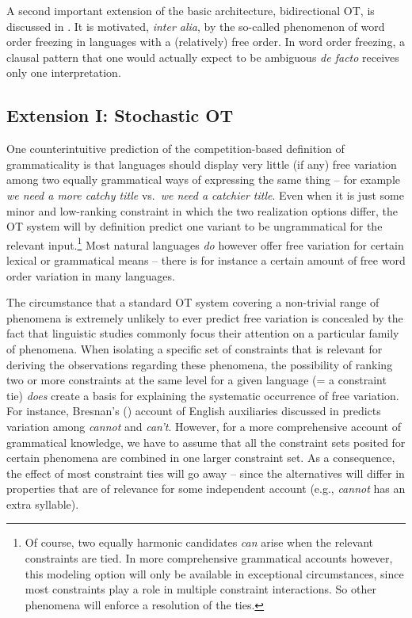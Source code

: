 \documentclass[output=paper,hidelinks]{langscibook}
\begin{document}
A second important extension of the basic architecture, bidirectional OT, is discussed in . It is motivated, \emph{inter alia}, by the so-called phenomenon of word order freezing in languages with a (relatively) free order. In word order freezing, a clausal pattern that one would actually expect to be ambiguous \emph{de facto} receives only one interpretation.

\subsection{Extension I: Stochastic OT}
\label{sec:OT:stoch-OT}

One counterintuitive prediction of the competition-based definition of grammaticality is that languages should display very little (if any) free variation among two equally grammatical ways of expressing the same thing -- for example \emph{we need a more catchy title} vs.\ \emph{we need a catchier title}. Even when it is just some minor and low-ranking constraint in which the two realization options differ, the OT system will by definition predict one variant to be ungrammatical for the relevant input.\footnote{Of course, two equally harmonic candidates \emph{can} arise when the relevant constraints are tied. In more comprehensive grammatical accounts however, this modeling option will only be available in exceptional circumstances, since most constraints play a role in multiple constraint interactions. So other phenomena will enforce a resolution of the ties.} Most natural languages \emph{do} however offer free variation for certain lexical or grammatical means -- there is for instance a certain amount of free word order variation in many languages. %

The  circumstance that a standard OT system covering a non-trivial range of phenomena is extremely unlikely to ever predict free variation is concealed by the fact that linguistic studies commonly focus their attention on a particular family of phenomena. When isolating a specific set of constraints that is relevant for deriving the observations regarding these phenomena, the possibility of ranking two or more constraints at the same level for a given language (= a constraint tie) \emph{does} create a basis for explaining the systematic occurrence of free variation. For instance, Bresnan's (\citeyear{Bresnan-Explaining-Morphosyntactic}) account of English auxiliaries discussed in  predicts variation among \emph{cannot} and \emph{can't}. However, for a more comprehensive account of grammatical knowledge, we have to assume that all the constraint sets posited for certain phenomena are combined in one larger constraint set. As a consequence, the effect of most constraint ties will go away -- since the alternatives will differ in properties that are of relevance for some independent account (e.g., \emph{cannot} has an extra syllable).
\end{document}
